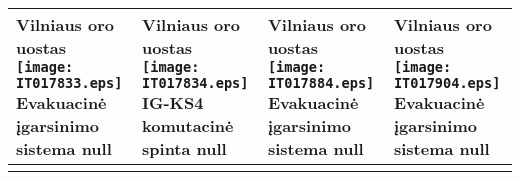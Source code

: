 \documentclass[a4paper,12pt]{article}
\begin{document}
 \tabletail{\hline}
\begin{supertabular}{|p{4.2cm}|p{4.2cm}|p{4.2cm}|p{4.2cm}|} \hline
Vilniaus oro uostas \newline \texttt{[image: IT017833.eps]} \newline Evakuacinė įgarsinimo sistema \newline \footnotesize {null} & Vilniaus oro uostas \newline \texttt{[image: IT017834.eps]} \newline IG-KS4 komutacinė spinta \newline \footnotesize {null} & Vilniaus oro uostas \newline \texttt{[image: IT017884.eps]} \newline Evakuacinė įgarsinimo sistema \newline \footnotesize {null} & Vilniaus oro uostas \newline \texttt{[image: IT017904.eps]} \newline Evakuacinė įgarsinimo sistema \newline \footnotesize {null}\\\hline
 &  & \\\hline

\end{supertabular}
\end{document}
